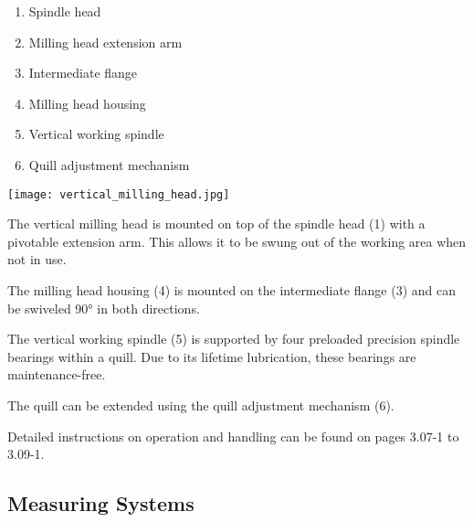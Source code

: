 \begin{minipage}{0.5\textwidth}
    \begin{enumerate}[itemsep=1pt,parsep=0pt]
        \item Spindle head
        \item Milling head extension arm
        \item Intermediate flange
        \item Milling head housing
        \item Vertical working spindle
        \item Quill adjustment mechanism
    \end{enumerate}
\end{minipage}%
\begin{minipage}{0.5\textwidth}
    \centering
    \texttt{[image: vertical\_milling\_head.jpg]}
    \label{fig:vertical_milling_head}
\end{minipage}

\vspace{1cm}

\noindent The vertical milling head is mounted on top of the spindle head (1) with a pivotable extension arm. This allows it to be swung out of the working area when not in use.

\vspace{.3cm}

\noindent The milling head housing (4) is mounted on the intermediate flange (3) and can be swiveled 90° in both directions.

\vspace{.3cm}

\noindent The vertical working spindle (5) is supported by four preloaded precision spindle bearings within a quill. Due to its lifetime lubrication, these bearings are maintenance-free.

\vspace{.3cm}

\noindent The quill can be extended using the quill adjustment mechanism (6).

\vspace{.3cm}

\noindent Detailed instructions on operation and handling can be found on pages 3.07-1 to 3.09-1.

\newpage
\subsection{Measuring Systems}

